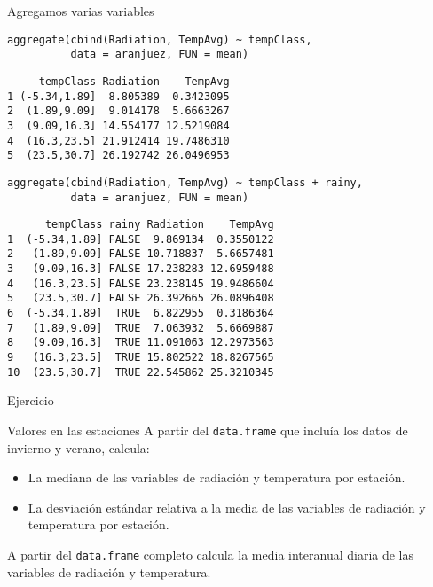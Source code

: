\documentclass[xcolor={usenames,svgnames,dvipsnames}]{beamer}
\begin{document}
\begin{frame}[label={sec:orgd531dcc},fragile]{Agregamos varias variables}
 \lstset{language=r,label= ,caption= ,captionpos=b,numbers=none}
\begin{lstlisting}
aggregate(cbind(Radiation, TempAvg) ~ tempClass,
          data = aranjuez, FUN = mean)
\end{lstlisting}

\begin{verbatim}
     tempClass Radiation    TempAvg
1 (-5.34,1.89]  8.805389  0.3423095
2  (1.89,9.09]  9.014178  5.6663267
3  (9.09,16.3] 14.554177 12.5219084
4  (16.3,23.5] 21.912414 19.7486310
5  (23.5,30.7] 26.192742 26.0496953
\end{verbatim}


\lstset{language=r,label= ,caption= ,captionpos=b,numbers=none}
\begin{lstlisting}
aggregate(cbind(Radiation, TempAvg) ~ tempClass + rainy,
          data = aranjuez, FUN = mean)
\end{lstlisting}

\begin{verbatim}
      tempClass rainy Radiation    TempAvg
1  (-5.34,1.89] FALSE  9.869134  0.3550122
2   (1.89,9.09] FALSE 10.718837  5.6657481
3   (9.09,16.3] FALSE 17.238283 12.6959488
4   (16.3,23.5] FALSE 23.238145 19.9486604
5   (23.5,30.7] FALSE 26.392665 26.0896408
6  (-5.34,1.89]  TRUE  6.822955  0.3186364
7   (1.89,9.09]  TRUE  7.063932  5.6669887
8   (9.09,16.3]  TRUE 11.091063 12.2973563
9   (16.3,23.5]  TRUE 15.802522 18.8267565
10  (23.5,30.7]  TRUE 22.545862 25.3210345
\end{verbatim}
\end{frame}


\begin{frame}[label={sec:orge794ee0},fragile]{Ejercicio}
 \begin{block}{Valores en las estaciones}
A partir del \texttt{data.frame} que incluía los datos de invierno y verano, calcula:

\begin{itemize}
\item La \alert{mediana} de las variables de radiación y temperatura por estación.
\item La \alert{desviación estándar} relativa a la media de las variables de radiación y temperatura por estación.
\end{itemize}

A partir del \texttt{data.frame} completo calcula la \alert{media} interanual diaria de las variables de radiación y temperatura.
\end{block}
\end{frame}
\end{document}
